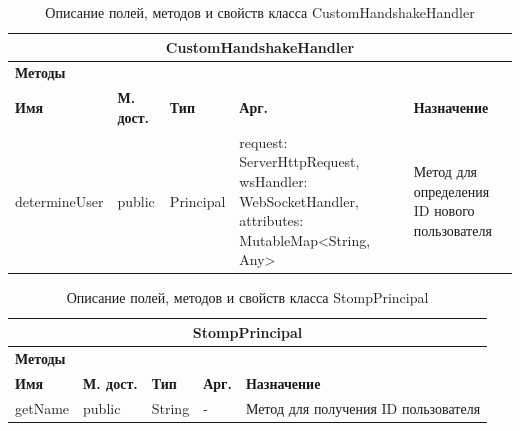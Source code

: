 \documentclass{../includes/TechDoc}
\begin{document}
    \begin{table}[h]
        \caption{\label{tab:class-CustomHandshakeHandler-table}Описание полей, методов и свойств класса CustomHandshakeHandler}
        \begin{tabularx}{\textwidth}{|l|l|l|p{4cm}|X|}
            \hline
            \multicolumn{5}{|c|}{CustomHandshakeHandler} \\ \hline
            \multicolumn{5}{|l|}{\textbf{Методы}} \\ \hline
            \textbf{Имя}   & \textbf{М. дост.} & \textbf{Тип} & \textbf{Арг.} & \textbf{Назначение}                      \\ \hline
            determineUser   & public            & Principal         & request: ServerHttpRequest, wsHandler: WebSocketHandler, attributes: MutableMap<String, Any>    & Метод для определения ID нового пользователя      \\ \hline
        \end{tabularx}
    \end{table}

    \begin{table}[h]
        \caption{\label{tab:class-StompPrincipal-table}Описание полей, методов и свойств класса StompPrincipal}
        \begin{tabularx}{\textwidth}{|l|l|l|l|X|}
            \hline
            \multicolumn{5}{|c|}{StompPrincipal} \\ \hline
            \multicolumn{5}{|l|}{\textbf{Методы}} \\ \hline
            \textbf{Имя}   & \textbf{М. дост.} & \textbf{Тип} & \textbf{Арг.} & \textbf{Назначение}                      \\ \hline
            getName   & public            & String         & -    & Метод для получения ID пользователя      \\ \hline
        \end{tabularx}
    \end{table}
\end{document}
